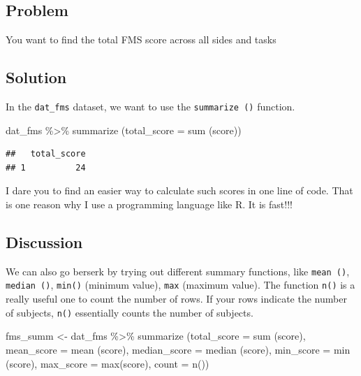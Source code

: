 \documentclass[
]{book}
\newenvironment{Shaded}{\begin{snugshade}}{\end{snugshade}}
\newcommand{\AttributeTok}[1]{\textcolor[rgb]{0.77,0.63,0.00}{#1}}
\newcommand{\FunctionTok}[1]{\textcolor[rgb]{0.00,0.00,0.00}{#1}}
\newcommand{\NormalTok}[1]{#1}
\newcommand{\OtherTok}[1]{\textcolor[rgb]{0.56,0.35,0.01}{#1}}
\newcommand{\SpecialCharTok}[1]{\textcolor[rgb]{0.00,0.00,0.00}{#1}}
\begin{document}
\hypertarget{problem-12}{%
\subsection{Problem}\label{problem-12}}

You want to find the total FMS score across all sides and tasks

\hypertarget{solution-12}{%
\subsection{Solution}\label{solution-12}}

In the \texttt{dat\_fms} dataset, we want to use the \texttt{summarize\ ()} function.

\begin{Shaded}
\begin{Highlighting}[]
\NormalTok{dat\_fms }\SpecialCharTok{\%\textgreater{}\%}
  \FunctionTok{summarize}\NormalTok{ (}\AttributeTok{total\_score =} \FunctionTok{sum}\NormalTok{ (score)) }
\end{Highlighting}
\end{Shaded}

\begin{verbatim}
##   total_score
## 1          24
\end{verbatim}

I dare you to find an easier way to calculate such scores in one line of code. That is one reason why I use a programming language like R. It is fast!!!

\hypertarget{discussion-5}{%
\subsection{Discussion}\label{discussion-5}}

We can also go berserk by trying out different summary functions, like \texttt{mean\ ()}, \texttt{median\ ()}, \texttt{min()} (minimum value), \texttt{max} (maximum value). The function \texttt{n()} is a really useful one to count the number of rows. If your rows indicate the number of subjects, \texttt{n()} essentially counts the number of subjects.

\begin{Shaded}
\begin{Highlighting}[]
\NormalTok{fms\_summ }\OtherTok{\textless{}{-}}\NormalTok{ dat\_fms }\SpecialCharTok{\%\textgreater{}\%}
  \FunctionTok{summarize}\NormalTok{ (}\AttributeTok{total\_score =} \FunctionTok{sum}\NormalTok{ (score),}
             \AttributeTok{mean\_score =} \FunctionTok{mean}\NormalTok{ (score),}
             \AttributeTok{median\_score =} \FunctionTok{median}\NormalTok{ (score),}
             \AttributeTok{min\_score =} \FunctionTok{min}\NormalTok{ (score),}
             \AttributeTok{max\_score =} \FunctionTok{max}\NormalTok{(score),}
             \AttributeTok{count =} \FunctionTok{n}\NormalTok{()) }
\end{Highlighting}
\end{Shaded}
\end{document}
